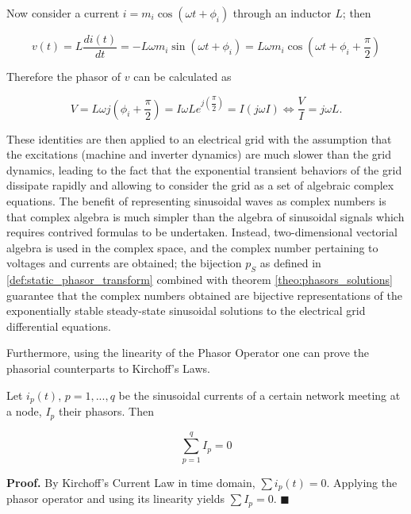 	Now consider a current $i = m_i\cos\left(\omega t + \phi_i\right)$ through an inductor $L$; then

\begin{equation} v(t) = L\dfrac{di(t)}{dt} = -L\omega m_i \sin\left(\omega t + \phi_i\right) = L\omega m_i\cos\left(\omega t + \phi_i + \dfrac{\pi}{2}\right) \end{equation}

	Therefore the phasor of $v$ can be calculated as

\begin{equation} V = L\omega j\left(\phi_i + \dfrac{\pi}{2}\right) = I \omega L e^{\displaystyle j\left(\dfrac{\pi}{2}\right)} = I \left(j\omega I\right) \Leftrightarrow \dfrac{V}{I} = j\omega L . \end{equation}

	These identities are then applied to an electrical grid with the assumption that the excitations (machine and inverter dynamics) are much slower than the grid dynamics, leading to the fact that the exponential transient behaviors of the grid dissipate rapidly and allowing to consider the grid as a set of algebraic complex equations. The benefit of representing sinusoidal waves as complex numbers is that complex algebra is much simpler than the algebra of sinusoidal signals which requires contrived formulas to be undertaken. Instead, two-dimensional vectorial algebra is used in the complex space, and the complex number pertaining to voltages and currents are obtained; the bijection $p_S$ as defined in \ref{def:static_phasor_transform} combined with theorem \ref{theo:phasors_solutions} guarantee that the complex numbers obtained are bijective representations of the exponentially stable steady-state sinusoidal solutions to the electrical grid differential equations.

	Furthermore, using the linearity of the Phasor Operator one can prove the phasorial counterparts to Kirchoff's Laws.

\begin{theorem} \label{theo:kirchoff_current_phasor}
Let $i_p(t)$, $p = 1,...,q$ be the sinusoidal currents of a certain network meeting at a node, $I_p$ their phasors. Then

\begin{equation} \sum\limits_{p=1}^q I_p = 0 \end{equation}

\end{theorem}
\noindent \textbf{Proof.} By Kirchoff's Current Law in time domain, $\sum i_p(t) = 0$. Applying the phasor operator and using its linearity yields $\sum I_p = 0$. \hfill$\blacksquare$
	
